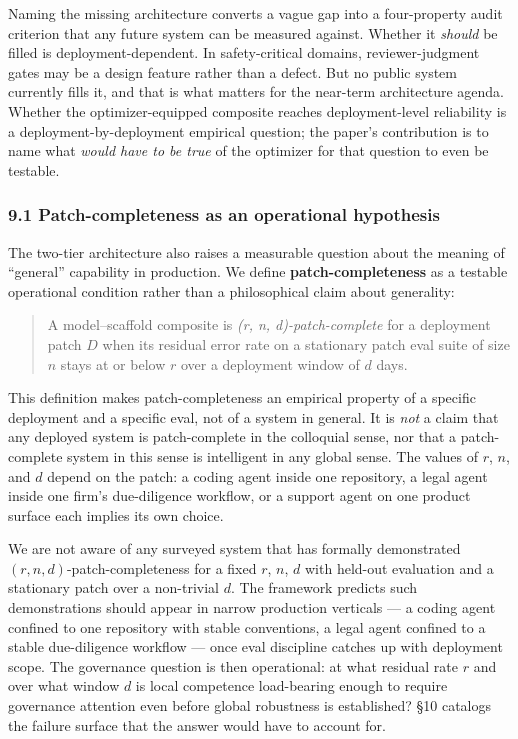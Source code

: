 \documentclass[
]{article}
\begin{document}
Naming the missing architecture converts a vague gap into a
four-property audit criterion that any future system can be measured
against. Whether it \emph{should} be filled is deployment-dependent. In
safety-critical domains, reviewer-judgment gates may be a design feature
rather than a defect. But no public system currently fills it, and that
is what matters for the near-term architecture agenda. Whether the
optimizer-equipped composite reaches deployment-level reliability is a
deployment-by-deployment empirical question; the paper's contribution is
to name what \emph{would have to be true} of the optimizer for that
question to even be testable.

\subsubsection{9.1 Patch-completeness as an operational
hypothesis}\label{patch-completeness-as-an-operational-hypothesis}

The two-tier architecture also raises a measurable question about the
meaning of ``general'' capability in production. We define
\textbf{patch-completeness} as a testable operational condition rather
than a philosophical claim about generality:

\begin{quote}
A model--scaffold composite is \emph{(r, n, d)-patch-complete} for a
deployment patch \(D\) when its residual error rate on a stationary
patch eval suite of size \(n\) stays at or below \(r\) over a deployment
window of \(d\) days.
\end{quote}

This definition makes patch-completeness an empirical property of a
specific deployment and a specific eval, not of a system in general. It
is \emph{not} a claim that any deployed system is patch-complete in the
colloquial sense, nor that a patch-complete system in this sense is
intelligent in any global sense. The values of \(r\), \(n\), and \(d\)
depend on the patch: a coding agent inside one repository, a legal agent
inside one firm's due-diligence workflow, or a support agent on one
product surface each implies its own choice.

We are not aware of any surveyed system that has formally demonstrated
\((r, n, d)\)-patch-completeness for a fixed \(r\), \(n\), \(d\) with
held-out evaluation and a stationary patch over a non-trivial \(d\). The
framework predicts such demonstrations should appear in narrow
production verticals --- a coding agent confined to one repository with
stable conventions, a legal agent confined to a stable due-diligence
workflow --- once eval discipline catches up with deployment scope. The
governance question is then operational: at what residual rate \(r\) and
over what window \(d\) is local competence load-bearing enough to
require governance attention even before global robustness is
established? §10 catalogs the failure surface that the answer would have
to account for.
\end{document}
